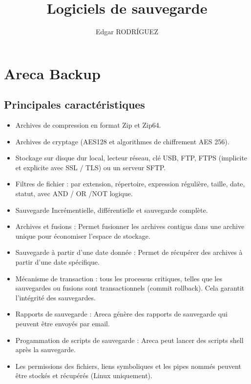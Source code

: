 \documentclass[a4paper,11pt]{report}
\title{Logiciels de sauvegarde}
\author{Edgar RODRÍGUEZ}
\begin{document}
\maketitle

\section{Areca Backup}
\subsection{Principales caractéristiques}
\begin{itemize}
  \item Archives de compression en format Zip et Zip64.
  \item Archives de cryptage (AES128 et algorithmes de chiffrement AES 256).
  \item Stockage sur disque dur local, lecteur réseau, clé USB, FTP, FTPS (implicite et explicite avec SSL / TLS) ou un serveur SFTP.
  \item Filtres de fichier : par extension, répertoire, expression régulière, taille, date, statut, avec AND / OR /NOT logique.
  \item Sauvegarde Incrémentielle, différentielle et sauvegarde complète.
  \item Archives et fusions : Permet fusionner les archives contigus dans une archive unique pour économiser l'espace de stockage.
  \item Sauvegarde à partir d'une date donnée : Permet de récupérer des archives à partir d'une date spécifique.
  \item Mécanisme de transaction : tous les processus critiques, telles que les sauvegardes ou fusions sont transactionnels (commit rollback). Cela garantit l'intégrité des sauvegardes.
  \item Rapports de sauvegarde : Areca génère des rapports de sauvegarde qui peuvent être envoyés par email.
  \item Progammation de scripts de sauvegarde : Areca peut lancer des scripts shell après la sauvegarde.
  \item Les permissions des fichiers, liens symboliques et les pipes nommés peuvent être stockés et récupérés (Linux uniquement).
\end{itemize}
\end{document}
